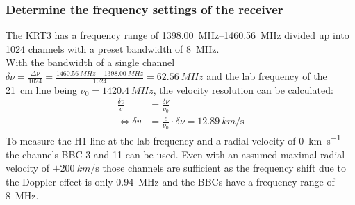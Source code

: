 \documentclass[10pt,a4paper, bibliography=totoc]{scrartcl}
\begin{document}
\subsubsection{Determine the frequency settings of the receiver}
The KRT3 has a frequency range of \qtyrange[range-units = repeat]{1398.00}{1460.56}{MHz} divided up into 1024 channels with a preset bandwidth of \qty{8}{MHz}.\\
With the bandwidth of a single channel $\delta\nu=\frac{\Delta\nu}{1024}=\frac{\qty{1460.56}{MHz}-\qty{1398.00}{MHz}}{1024}=\qty{62.56}{MHz}$ and the lab frequency of the \qty{21}{cm} line being $\nu_{0}=\qty{1420.4}{MHz}$, the velocity resolution can be calculated:
\begin{align}
	\frac{\delta v}{c}&=\frac{\delta\nu}{\nu_{0}}\\
	\Leftrightarrow \delta v &= \frac{c}{\nu_{0}}\cdot \delta\nu=\qty{12.89}{km\per\s}
\end{align}
To measure the H1 line at the lab frequency and a radial velocity of \qty{0}{km\per\s} the channels BBC 3 and 11 can be used. Even with an assumed maximal radial velocity of $\pm\qty{200}{km\per\s}$ those channels are sufficient as the frequency shift due to the Doppler effect is only \qty{0.94}{MHz} and the BBCs have a frequency range of \qty{8}{MHz}.
\end{document}

